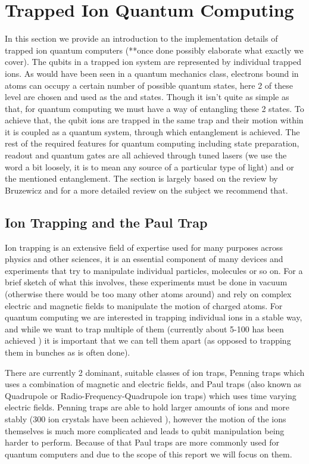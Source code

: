 
\section{Trapped Ion Quantum Computing} \label{sec:Trapped}
In this section we provide an introduction to the implementation details of trapped ion quantum computers (**once done possibly elaborate what exactly we cover).
The qubits in a trapped ion system are represented by individual trapped ions.
As would have been seen in a quantum mechanics class, electrons bound in atoms can occupy a certain number of possible quantum states, here 2 of these level are chosen and used as the \kz and \ko states.
Though it isn't quite as simple as that, for quantum computing we must have a way of entangling these 2 states.
To achieve that, the qubit ions are trapped in the same trap and their motion within it is coupled as a quantum system, through which entanglement is achieved.
The rest of the required features for quantum computing including state preparation, readout and quantum gates are all achieved through tuned lasers (we use the word a bit loosely, it is to mean any source of a particular type of light) and or the mentioned entanglement.
The section is largely based on the review by Bruzewicz \cite{bruzewiczTrappedionQuantumComputing2019} and for a more detailed review on the subject we recommend that.

\subsection{Ion Trapping and the Paul Trap}
Ion trapping is an extensive field of expertise used for many purposes across physics and other sciences, it is an essential component of many devices and experiments that try to manipulate individual particles, molecules or so on.
For a brief sketch of what this involves, these experiments must be done in vacuum (otherwise there would be too many other atoms around) and rely on complex electric and magnetic fields to manipulate the motion of charged atoms.
For quantum computing we are interested in trapping individual ions in a stable way, and while we want to trap multiple of them (currently about 5-100 has been achieved \cite{paganoCryogenicTrappedionSystem2018}) it is important that we can tell them apart (as opposed to trapping them in bunches as is often done).

There are currently 2 dominant, suitable classes of ion traps, Penning traps which uses a combination of magnetic and electric fields, and Paul traps (also known as Quadrupole or Radio-Frequency-Quadrupole ion traps) which uses time varying electric fields.
Penning traps are able to hold larger amounts of ions and more stably (300 ion crystals have been achieved \cite{bohnetQuantumSpinDynamics2016}), however the motion of the ions themselves is much more complicated and leads to qubit manipulation being harder to perform.
Because of that Paul traps are more commonly used for quantum computers and due to the scope of this report we will focus on them.

